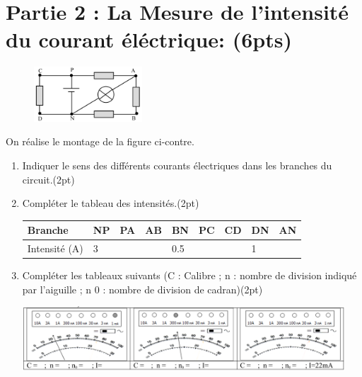 \documentclass[12pt]{article}
\begin{document}
\vspace{3cm}

\hrulefill\\
\section*{Partie 2 : La Mesure de l’intensité du courant éléctrique: \dotfill(6pts)}

\begin{figure}
    \vspace{-1cm}
\begin{center}
    \includegraphics[width=0.36\textwidth]{./img/circuit_01.png}
\end{center}
    \end{figure}
On réalise le montage de la figure ci-contre.
\begin{enumerate}
    \item Indiquer le sens des différents courants électriques dans les
        branches du circuit.\dotfill(2pt)
    \item Compléter le tableau des intensités.\dotfill(2pt)
          \begin{tabular}{ | l | l | l | l |l|l|l|l|l|}
    \hline
              Branche       & NP & PA & AB & BN & PC & CD & DN & AN  \\\hline
              Intensité (A) & 3   &    &    & 0.5   &    &  &1       &       \\ \hline
    \end{tabular}
\item Compléter les tableaux suivants (C : Calibre ; n : nombre de division indiqué par l’aiguille ; n 0  : nombre de
    division de cadran)\dotfill(2pt)
\begin{center}
    \includegraphics[width=0.95\textwidth]{./img/circuit_03.png}
\end{center}

\end{enumerate}
\end{document}
